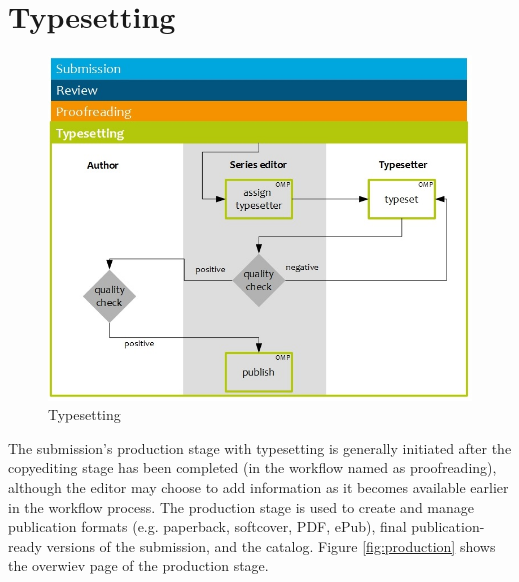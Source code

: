 
 


\section{Typesetting} 

\begin{figure}[h] \centering
\includegraphics[width=1\textwidth]{./img/workflow_typesetting.jpg} \caption{Typesetting}
\label{fig:workflowTypesetting}
\end{figure}


The submission's production stage with typesetting is generally initiated after the copyediting stage has been completed (in the workflow named as proofreading), although the editor may choose to add information as it becomes available earlier in the workflow process. The production stage is used to create and manage publication formats (e.g. paperback, softcover, PDF, ePub), final publication-ready versions of the submission, and the catalog. 
Figure \ref{fig:production} shows the overwiev page of the production stage.

